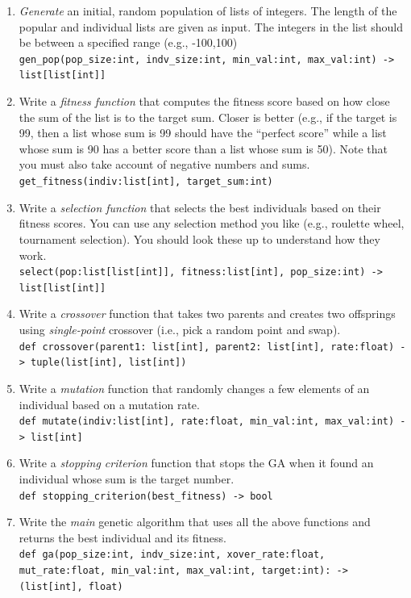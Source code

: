 \documentclass[oneside,11pt,dvipsnames]{book}
\newcommand{\code}[1]{\texttt{#1}}
\begin{document}
\begin{enumerate}
    \item \emph{Generate} an initial, random population of lists of integers. The length of the popular and individual lists are given as input.  The integers in the list should be between a specified range (e.g., -100,100)\\
    \code{gen\_pop(pop\_size:int, indv\_size:int, min\_val:int, max\_val:int) -> list[list[int]]}
    \item Write a \emph{fitness function} that computes the fitness score based on how close the sum of the list is to the target sum. Closer is better (e.g., if the target is 99, then a list whose sum is 99 should have the ``perfect score'' while a list whose sum is 90 has a better score than a list whose sum is 50). Note that you must also take account of negative numbers and sums.  \\
    \code{get\_fitness(indiv:list[int], target\_sum:int)}
    \item Write a \emph{selection function} that selects the best individuals based on their fitness scores. You can use any selection method you like (e.g., roulette wheel, tournament selection). You should look these up to understand how they work.\\
    \code{select(pop:list[list[int]], fitness:list[int], pop\_size:int) -> list[list[int]]}
    \item Write a \emph{crossover} function that takes two parents and creates two offsprings using \emph{single-point} crossover (i.e., pick a random point and swap).\\
    \code{def crossover(parent1: list[int], parent2: list[int], rate:float) -> tuple(list[int], list[int])}
    \item Write a \emph{mutation} function that randomly changes a few elements of an individual based on a mutation rate.\\
    \code{def mutate(indiv:list[int], rate:float, min\_val:int, max\_val:int) -> list[int]}
    \item Write a \emph{stopping criterion} function that stops the GA when it found an individual whose sum is the target number.\\
    \code{def stopping\_criterion(best\_fitness) -> bool}
    \item Write the \emph{main} genetic algorithm that uses all the above functions and returns the best individual and its fitness.\\
    \code{def ga(pop\_size:int, indv\_size:int, xover\_rate:float, mut\_rate:float, min\_val:int, max\_val:int, target:int): -> (list[int], float)}

\end{enumerate}
\end{document}
